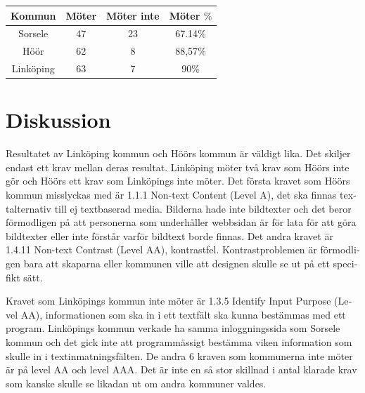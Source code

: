 \documentclass[11p]{article}
\begin{document}
\begin{otherlanguage}{swedish}
\begin{center}
    \begin{tabular}{ |c|c|c|c|}
        \hline
        Kommun & Möter & Möter inte & Möter $\%$ \\  \hline
        Sorsele & 47 & 23 & 67.14$\%$ \\ \hline
        Höör & 62 & 8 & 88,57$\%$ \\ \hline
        Linköping & 63 & 7 & 90$\%$ \\ \hline
    \end{tabular}
    \end{center}

    \newpage
    \section{Diskussion} %
    Resultatet av Linköping kommun och Höörs kommun är väldigt lika.
    Det skiljer endast ett krav mellan deras resultat.
    Linköping möter två krav som Höörs inte gör och Höörs ett krav som Linköpings inte möter.
    Det första kravet som  Höörs kommun misslyckas med är 1.1.1 Non-text Content (Level A), det ska finnas textalternativ till ej textbaserad media.
    Bilderna hade inte bildtexter och det beror förmodligen på att personerna som underhåller webbsidan är för lata för att göra bildtexter eller inte förstår varför bildtext borde finnas.
    Det andra kravet är 1.4.11 Non-text Contrast (Level AA), kontrastfel.
    Kontrastproblemen är förmodligen bara att skaparna eller kommunen ville att designen skulle se ut på ett specifikt sätt.

    Kravet som Linköpings kommun inte möter är 1.3.5 Identify Input Purpose (Level AA), informationen som ska in i ett textfält ska kunna bestämmas med ett program.
    Linköpings kommun verkade ha samma inloggningssida som Sorsele kommun och det gick inte att programmässigt bestämma viken information som skulle in i textinmatningsfälten.
    De andra 6 kraven som kommunerna inte möter är på level AA och level AAA.
    Det är inte en så stor skillnad i antal klarade krav som kanske skulle se likadan ut om andra kommuner valdes.


\end{otherlanguage}
\end{document}
